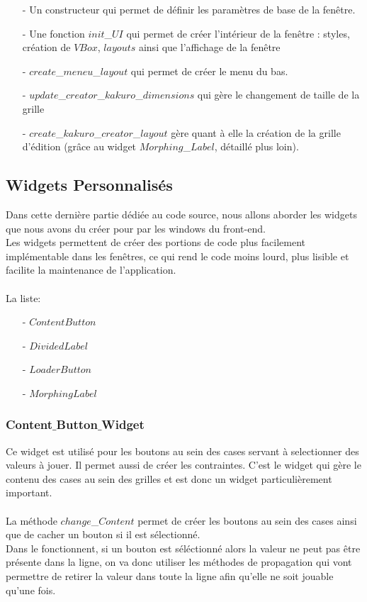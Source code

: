\documentclass[french,12pt]{article}
\begin{document}
\begin{enumerate}
	\item[-] Un constructeur qui permet de définir les paramètres de base de la fenêtre.
	\item[-] Une fonction $init$\_$UI$ qui permet de créer l'intérieur de la fenêtre : 			styles, création de $VBox$, $layouts$ ainsi que l'affichage de la fenêtre
	\item[-] $create$\_$meneu$\_$layout$ qui permet de créer le menu du bas.
	\item[-] $update$\_$creator$\_$kakuro$\_$dimensions$ qui gère le changement de taille 		de la grille
	\item[-] $create$\_$kakuro$\_$creator$\_$layout$ gère quant à elle la création de la grille d'édition (grâce au widget $Morphing$\_$Label$, détaillé plus loin).
\end{enumerate}
\newpage 



\subsection{Widgets Personnalisés}
Dans cette dernière partie dédiée au code source, nous allons aborder les widgets que nous avons du créer pour par les windows du front-end. \\
Les widgets permettent de créer des portions de code plus facilement implémentable dans les fenêtres, ce qui rend le code moins lourd, plus lisible et facilite la maintenance de l'application. \\ \\
 La liste: \\

\begin{enumerate}
	\item[-] $ContentButton$
	\item[-] $DividedLabel$
	\item[-] $LoaderButton$
	\item[-] $MorphingLabel$ \\
\end{enumerate}

\subsubsection{Content$\_$Button$\_$Widget}
Ce widget est utilisé pour les boutons au sein des cases servant à selectionner des valeurs à jouer. Il permet aussi de créer les contraintes. C'est le widget qui gère le contenu des cases au sein des grilles et est donc un widget particulièrement important. \\ \\
La méthode $change$\_$Content$ permet de créer les boutons au sein des cases ainsi que de cacher un bouton si il est sélectionné.   \\
Dans le fonctionnent, si un bouton est séléctionné alors la valeur ne peut pas être présente dans la ligne, on va donc utiliser les méthodes de propagation qui vont permettre de retirer la valeur dans toute la ligne afin qu'elle ne soit jouable qu'une fois.
\\
\end{document}
